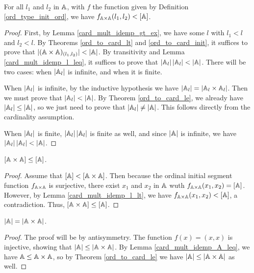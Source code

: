 \documentclass[../../math.tex]{subfiles}
\begin{document}
\begin{lemma} \label{card_mult_idemp_l_lt}
    For all $l_1$ and $l_2$ in $\mathbb{A}$, with $f$ the function given by Definition
    \ref{ord_type_init_ord}, we have $f_{\mathbb{A} \times \mathbb{A}}(l_1, l_2) < [\mathbb{A}]$.
\end{lemma}
\begin{proof}
    First, by Lemma \ref{card_mult_idemp_gt_ex}, we have some $l$ with $l_1 < l$
    and $l_2 < l$.  By Theorems \ref{ord_to_card_lt} and \ref{ord_to_card_init},
    it suffices to prove that $|(\mathbb{A} \times \mathbb{A})_{(l_1, l_2)}| < |\mathbb{A}|$.  By
    transitivity and Lemma \ref{card_mult_idemp_l_leq}, it suffices to prove
    that $|\mathbb{A}_l| \, |\mathbb{A}_l| < |\mathbb{A}|$.  There will be two cases: when $|\mathbb{A}_l|$ is
    infinite, and when it is finite.

    When $|\mathbb{A}_l|$ is infinite, by the inductive hypothesis we have $|\mathbb{A}_l| =
    |\mathbb{A}_l \times \mathbb{A}_l|$.  Then we must prove that $|\mathbb{A}_l| < |\mathbb{A}|$.  By Theorem
    \ref{ord_to_card_le}, we already have $|\mathbb{A}_l| \leq |\mathbb{A}|$, so we just need to
    prove that $|\mathbb{A}_l| \neq |\mathbb{A}|$.  This follows directly from the cardinality
    assumption.

    When $|\mathbb{A}_l|$ is finite, $|\mathbb{A}_l| \, |\mathbb{A}_l|$ is finite as well, and since
    $|\mathbb{A}|$ is infinite, we have $|\mathbb{A}_l| \, |\mathbb{A}_l| < |\mathbb{A}|$.
\end{proof}

\begin{lemma} \label{card_mult_idemp_A_leq}
    $[\mathbb{A} \times \mathbb{A}] \leq [\mathbb{A}]$.
\end{lemma}
\begin{proof}
    Assume that $[\mathbb{A}] < [\mathbb{A} \times \mathbb{A}]$.  Then because the ordinal initial
    segment function $f_{\mathbb{A} \times \mathbb{A}}$ is surjective, there exist $x_1$ and
    $x_2$ in $\mathbb{A}$ wuth $f_{\mathbb{A} \times \mathbb{A}}(x_1, x_2) = [\mathbb{A}]$.  However, by Lemma
    \ref{card_mult_idemp_l_lt}, we have $f_{\mathbb{A} \times \mathbb{A}}(x_1, x_2) < [\mathbb{A}]$, a
    contradiction.  Thus, $[\mathbb{A} \times \mathbb{A}] \leq [\mathbb{A}]$.
\end{proof}

\begin{lemma} \label{card_idemp}
    $|\mathbb{A}| = |\mathbb{A} \times \mathbb{A}|$.
\end{lemma}
\begin{proof}
    The proof will be by antisymmetry.  The function $f(x) = (x, x)$ is
    injective, showing that $|\mathbb{A}| \leq |\mathbb{A} \times \mathbb{A}|$.  By Lemma
    \ref{card_mult_idemp_A_leq}, we have $\mathbb{A} \leq \mathbb{A} \times \mathbb{A}$, so by Theorem
    \ref{ord_to_card_le} we have $|\mathbb{A}| \leq |\mathbb{A} \times \mathbb{A}|$ as well.
\end{proof}
\end{document}
